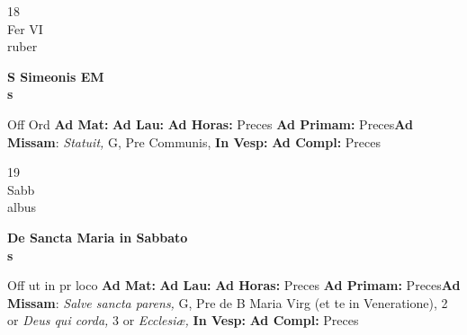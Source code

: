 \documentclass[10pt, openany]{book}
\begin{document}
    \begin{center}
        \begin{minipage}{3.5in}
            \vspace{2em}
            \begin{minipage}{0.5in}
                {\Huge 18} \\
                {\normalsize Fer VI} \\
                {\normalsize ruber}
            \end{minipage}
            \begin{minipage}{3.0in}
                \textbf{ \large S Simeonis EM \\
                \textnormal{\normalsize s}} \\ 
            \end{minipage}
            \begin{justify}Off Ord
                \textbf{Ad Mat: }
                \textbf{Ad Lau: }
                \textbf{Ad Horas: }Preces
                \textbf{Ad Primam: }Preces\textbf{Ad Missam}: \textit{Statuit,} G, Pre Communis,  
                \textbf{In Vesp: }
                \textbf{Ad Compl: }Preces
            \end{justify}
        \end{minipage}
    \end{center}

    \begin{center}
        \begin{minipage}{3.5in}
            \vspace{2em}
            \begin{minipage}{0.5in}
                {\Huge 19} \\
                {\normalsize Sabb} \\
                {\normalsize albus}
            \end{minipage}
            \begin{minipage}{3.0in}
                \textbf{ \large De Sancta Maria in Sabbato \\
                \textnormal{\normalsize s}} \\ 
            \end{minipage}
            \begin{justify}Off ut in pr loco
                \textbf{Ad Mat: }
                \textbf{Ad Lau: }
                \textbf{Ad Horas: }Preces
                \textbf{Ad Primam: }Preces\textbf{Ad Missam}: \textit{Salve sancta parens,} G, Pre de B Maria Virg (et te in Veneratione), 2 or \textit{Deus qui corda,} 3 or \textit{Ecclesiæ,}  
                \textbf{In Vesp: }
                \textbf{Ad Compl: }Preces
            \end{justify}
        \end{minipage}
    \end{center}
\end{document}
